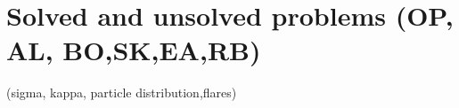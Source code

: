 \section{Solved and unsolved problems      (OP, AL, BO,SK,EA,RB)}
\label{sec:discussion}
(sigma, kappa, particle distribution,flares)